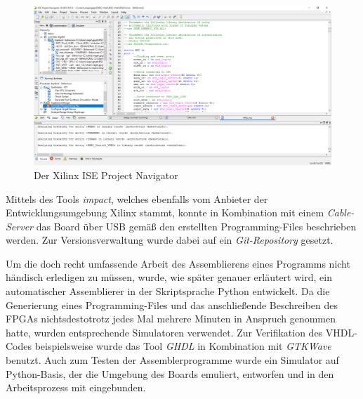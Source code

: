 \begin{figure}[H]
\centering
\includegraphics[width=1.0\textwidth]{ISE.png}
\caption{Der Xilinx ISE Project Navigator}
\label{fig:tool}
\end{figure}

Mittels des Tools \textit{impact}, welches ebenfalls vom Anbieter der
Entwicklungsumgebung Xilinx stammt, konnte in Kombination mit einem
\textit{Cable-Server} das Board \"uber USB gem\"a{\ss} den erstellten
Programming-Files beschrieben werden. Zur Versionsverwaltung wurde dabei
auf ein \textit{Git-Repository} gesetzt.

Um die doch recht umfassende Arbeit des Assemblierens eines Programms nicht
h\"andisch erledigen zu m\"ussen, wurde, wie sp\"ater genauer erl\"autert wird,
ein automatischer Assemblierer in der Skriptsprache Python entwickelt. Da die
Generierung eines Programming-Files und das anschlie\ss{}ende Beschreiben des
FPGAs nichtsdestotrotz jedes Mal mehrere Minuten in Anspruch genommen hatte,
wurden entsprechende Simulatoren verwendet. Zur Verifikation des VHDL-Codes
beispielsweise wurde das Tool \textit{GHDL} in Kombination mit \textit{GTKWave}
benutzt. Auch zum Testen der Assemblerprogramme wurde ein Simulator auf
Python-Basis, der die Umgebung des Boards emuliert, entworfen und in den
Arbeitsprozess mit eingebunden.
